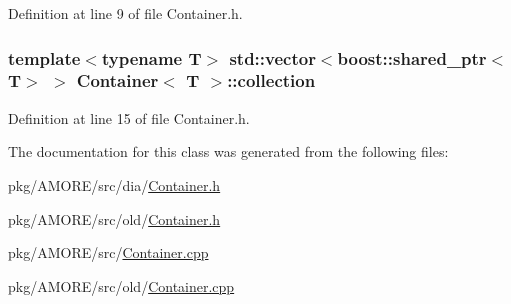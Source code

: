 Definition at line 9 of file Container.h.

\hypertarget{class_container_a6cc12233bceb7d72709320d2c57e3398}{
\subsubsection[{collection}]{\setlength{\rightskip}{0pt plus 5cm}template$<$typename T$>$ std::vector$<$boost::shared\_\-ptr$<$T$>$ $>$ {\bf Container}$<$ T $>$::{\bf collection}}}
\label{class_container_a6cc12233bceb7d72709320d2c57e3398}


Definition at line 15 of file Container.h.



The documentation for this class was generated from the following files:\begin{DoxyCompactItemize}
\item 
pkg/AMORE/src/dia/\hyperlink{dia_2_container_8h}{Container.h}\item 
pkg/AMORE/src/old/\hyperlink{old_2_container_8h}{Container.h}\item 
pkg/AMORE/src/\hyperlink{_container_8cpp}{Container.cpp}\item 
pkg/AMORE/src/old/\hyperlink{old_2_container_8cpp}{Container.cpp}\end{DoxyCompactItemize}
